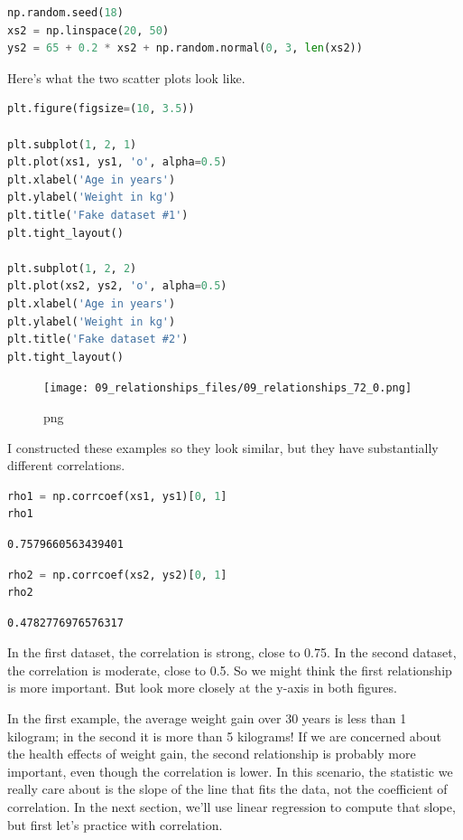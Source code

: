 \documentclass[
]{book}
\begin{document}
\begin{lstlisting}[language=Python]
np.random.seed(18)
xs2 = np.linspace(20, 50)
ys2 = 65 + 0.2 * xs2 + np.random.normal(0, 3, len(xs2))
\end{lstlisting}

Here's what the two scatter plots look like.

\begin{lstlisting}[language=Python]
plt.figure(figsize=(10, 3.5))

plt.subplot(1, 2, 1)
plt.plot(xs1, ys1, 'o', alpha=0.5)
plt.xlabel('Age in years')
plt.ylabel('Weight in kg')
plt.title('Fake dataset #1')
plt.tight_layout()

plt.subplot(1, 2, 2)
plt.plot(xs2, ys2, 'o', alpha=0.5)
plt.xlabel('Age in years')
plt.ylabel('Weight in kg')
plt.title('Fake dataset #2')
plt.tight_layout()
\end{lstlisting}

\begin{figure}
\centering
\texttt{[image: 09\_relationships\_files/09\_relationships\_72\_0.png]}
\caption{png}
\end{figure}

I constructed these examples so they look similar, but they have
substantially different correlations.

\begin{lstlisting}[language=Python]
rho1 = np.corrcoef(xs1, ys1)[0, 1]
rho1
\end{lstlisting}

\begin{lstlisting}
0.7579660563439401
\end{lstlisting}

\begin{lstlisting}[language=Python]
rho2 = np.corrcoef(xs2, ys2)[0, 1]
rho2
\end{lstlisting}

\begin{lstlisting}
0.4782776976576317
\end{lstlisting}

In the first dataset, the correlation is strong, close to 0.75. In the
second dataset, the correlation is moderate, close to 0.5. So we might
think the first relationship is more important. But look more closely at
the y-axis in both figures.

In the first example, the average weight gain over 30 years is less than
1 kilogram; in the second it is more than 5 kilograms! If we are
concerned about the health effects of weight gain, the second
relationship is probably more important, even though the correlation is
lower. In this scenario, the statistic we really care about is the slope
of the line that fits the data, not the coefficient of correlation. In
the next section, we'll use linear regression to compute that slope, but
first let's practice with correlation.
\end{document}
